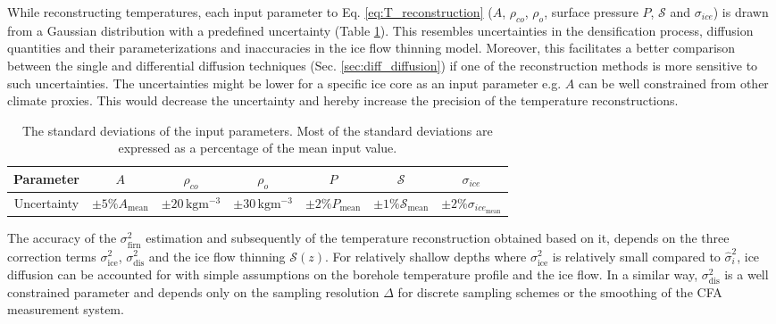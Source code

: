 \documentclass[11pt, draftcls, onecolumn]{IEEEtran} %
\numberwithin{equation}{section}
\numberwithin{table}{section}
\numberwithin{figure}{section}
\begin{document}
While reconstructing temperatures, each input parameter to Eq. \ref{eq:T_reconstruction} 
($A$, $\rho_{co}$, $\rho_o$, surface pressure $P$, $\mathcal{S}$ and $\sigma_{ice}$) is drawn from a Gaussian distribution with a predefined uncertainty (Table \ref{tbl:model_unc}).
This resembles uncertainties in the densification process, diffusion quantities and their parameterizations and inaccuracies in the 
ice flow thinning model.
Moreover, this facilitates a better comparison between the single and differential diffusion techniques (Sec. \ref{sec:diff_diffusion}) 
if one of the reconstruction methods is more sensitive to such uncertainties.
The uncertainties might be lower for a specific ice core as an input parameter e.g. $A$ can be well constrained from other climate proxies.
This would decrease the uncertainty and hereby increase the precision of the temperature reconstructions.


\begin{table}[H]
	\center
	\caption{The standard deviations of the input parameters. 
		Most of the standard deviations are expressed as a percentage of the mean input value.}
	\label{tbl:model_unc}
	\begin{tabular}{c c c c c c c } 
		\toprule
		Parameter & $A$  & $\rho_{co}$  & $\rho_o$  & $P$  & $\mathcal{S}$ & $\sigma_{ice}$ \\
		\midrule
		Uncertainty &	$\pm 5 \% A_\mathrm{mean} $  &  $\pm20 \, \mathrm{kg m^{-3}}$  &  $\pm30 \, \mathrm{kg m^{-3}}$   &    $\pm 2 \% P_\mathrm{mean} $  &     $\pm 1 \% \mathcal{S}_\mathrm{mean} $ 	 & $\pm 2 \% \sigma_{ice_\mathrm{mean}} $ \\
		\bottomrule		
	\end{tabular}
\end{table}


The accuracy of the $\sigma^2_\text{firn}$ estimation and subsequently 
of the temperature reconstruction 
obtained based on it, depends on the three correction terms  $\sigma^2_{\mathrm{ice}}$, 
$\sigma^2_{\mathrm{dis}}$ and the ice flow thinning $\mathcal{S}(z)$. For relatively shallow depths 
where $\sigma^2_{\mathrm{ice}}$
is relatively small compared to $\widehat{\sigma}_i^2$, ice diffusion can be accounted for with 
simple assumptions on the  borehole temperature profile and the ice flow. 
In a similar way, 
$\sigma^2_{\mathrm{dis}}$ is a well constrained parameter and depends only on the sampling
resolution $\Delta$ for discrete sampling schemes or the smoothing of the CFA measurement system.
\end{document}
